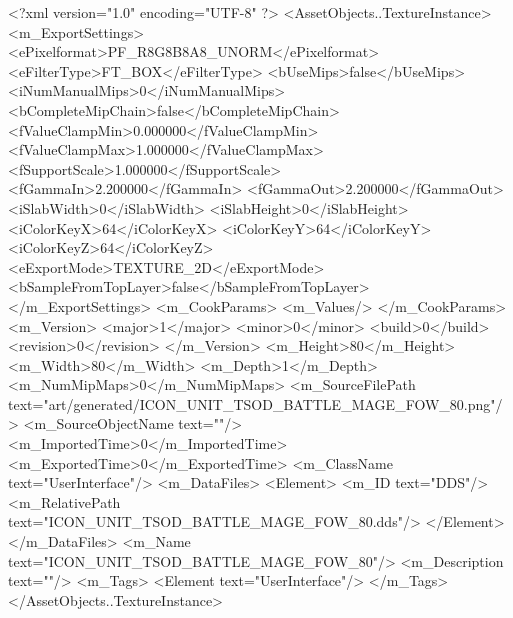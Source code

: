 <?xml version="1.0" encoding="UTF-8" ?>
<AssetObjects..TextureInstance>
	<m_ExportSettings>
		<ePixelformat>PF_R8G8B8A8_UNORM</ePixelformat>
		<eFilterType>FT_BOX</eFilterType>
		<bUseMips>false</bUseMips>
		<iNumManualMips>0</iNumManualMips>
		<bCompleteMipChain>false</bCompleteMipChain>
		<fValueClampMin>0.000000</fValueClampMin>
		<fValueClampMax>1.000000</fValueClampMax>
		<fSupportScale>1.000000</fSupportScale>
		<fGammaIn>2.200000</fGammaIn>
		<fGammaOut>2.200000</fGammaOut>
		<iSlabWidth>0</iSlabWidth>
		<iSlabHeight>0</iSlabHeight>
		<iColorKeyX>64</iColorKeyX>
		<iColorKeyY>64</iColorKeyY>
		<iColorKeyZ>64</iColorKeyZ>
		<eExportMode>TEXTURE_2D</eExportMode>
		<bSampleFromTopLayer>false</bSampleFromTopLayer>
	</m_ExportSettings>
	<m_CookParams>
		<m_Values/>
	</m_CookParams>
	<m_Version>
		<major>1</major>
		<minor>0</minor>
		<build>0</build>
		<revision>0</revision>
	</m_Version>
	<m_Height>80</m_Height>
	<m_Width>80</m_Width>
	<m_Depth>1</m_Depth>
	<m_NumMipMaps>0</m_NumMipMaps>
	<m_SourceFilePath text="art/generated/ICON_UNIT_TSOD_BATTLE_MAGE_FOW_80.png"/>
	<m_SourceObjectName text=""/>
	<m_ImportedTime>0</m_ImportedTime>
	<m_ExportedTime>0</m_ExportedTime>
	<m_ClassName text="UserInterface"/>
	<m_DataFiles>
		<Element>
			<m_ID text="DDS"/>
			<m_RelativePath text="ICON_UNIT_TSOD_BATTLE_MAGE_FOW_80.dds"/>
		</Element>
	</m_DataFiles>
	<m_Name text="ICON_UNIT_TSOD_BATTLE_MAGE_FOW_80"/>
	<m_Description text=""/>
	<m_Tags>
		<Element text="UserInterface"/>
	</m_Tags>
</AssetObjects..TextureInstance>
